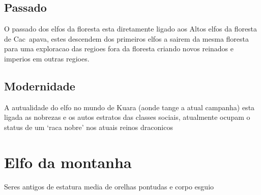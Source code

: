 \documentclass{book}
\begin{document}
\section{Passado}
O passado dos elfos da floresta esta diretamente ligado aos Altos elfos da floresta de 
Cac~apava, estes descendem dos primeiros elfos a sairem da mesma floresta para uma exploracao
das regioes fora da floresta criando novos reinados e imperios em outras regioes.
\section{Modernidade}
A autualidade do elfo no mundo de Kuara (aonde tange a atual campanha) esta ligada as nobrezas 
e os autos estratos das classes sociais, atualmente ocupam o status de um `raca nobre' nos 
atuais reinos draconicos 

\chapter{Elfo da montanha}
    Seres antigos de estatura media de orelhas pontudas e corpo esguio
\end{document}
